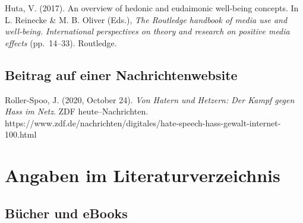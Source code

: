 \documentclass[
  letterpaper,
  DIV=11]{scrreprt}
\begin{document}
Huta, V. (2017). An overview of hedonic and eudaimonic well-being
concepts. In L. Reinecke \& M. B. Oliver (Eds.), \emph{The Routledge
handbook of media use and well-being. International perspectives on
theory and research on positive media effects} (pp.~14--33). Routledge.

\hypertarget{beitrag-auf-einer-nachrichtenwebsite}{%
\subsection{Beitrag auf einer
Nachrichtenwebsite}\label{beitrag-auf-einer-nachrichtenwebsite}}

Roller-Spoo, J. (2020, October 24). \emph{Von Hatern und Hetzern: Der
Kampf gegen Hass im Netz}. ZDF heute--Nachrichten.
https://www.zdf.de/nachrichten/digitales/hate-speech-hass-gewalt-internet-100.html

\hypertarget{sec-angaben-im-literaturverzeichnis}{%
\section{Angaben im
Literaturverzeichnis}\label{sec-angaben-im-literaturverzeichnis}}

\hypertarget{sec-buxfccher-und-ebooks}{%
\subsection{Bücher und eBooks}\label{sec-buxfccher-und-ebooks}}
\end{document}
